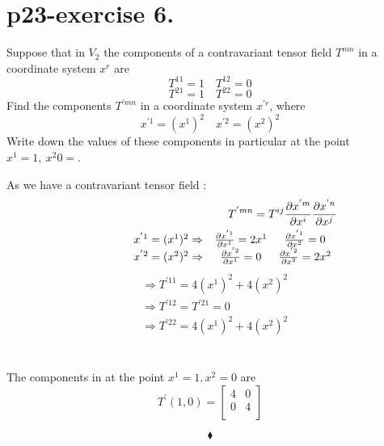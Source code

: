 \section{p23-exercise 6.}
\begin{tcolorbox}
Suppose that in $V_2$ the components of a contravariant tensor field $T^{mn}$ in a coordinate system $x^r$ are 
$$T^{11}=1 \quad T^{12}=0$$
$$T^{21}=1 \quad T^{22}=0$$
Find the components $T^{'mn}$ in a coordinate system $x^{'r}$, where
$$x^{'1} =(x^{1})^2\quad x^{'2} = (x^{2})^2$$
Write down the values of these components in particular at the point $x^1 = 1,\ x^2 0 =$.
\end{tcolorbox}
As we have a contravariant tensor field :
\begin{align*}
\ T^{'mn} =  T^{ij}\pdv{x^{'m}}{x^{i}}\pdv{x^{'n}}{x^{j}}\\
 \begin{array}{ccc}
   \quad \quad \quad \quad  x^{'1} =(x^{1})^2  \Rightarrow & \pdv{x^{'1}}{x^{1}} = 2x^{1} & \pdv{x^{'1}}{x^{2}} = 0\\
\quad \quad \quad \quad x^{'2} =(x^{2})^2  \Rightarrow & \pdv{x^{'2}}{x^{1}} = 0 & \pdv{x^{'2}}{x^{2}} = 2x^{2}\\
  \end{array}\\
  \end{align*}
  \begin{align*}
  &\Rightarrow T^{'11} = 4(x^{1})^2 + 4(x^{2})^2 \\
  &\Rightarrow T^{'12} = T^{'21}=0 \\
  &\Rightarrow T^{'22} = 4(x^{1})^2 + 4(x^{2})^2
  \end{align*}\\\\
  The components in  at the point $x^1 = 1, x^2 = 0$ are
  $$T^{'}(1,0) = \left[{\begin{array}{cc} 4 & 0 \\
    0 & 4 \\ 
    \end{array} } \right]$$
    
    $$\blacklozenge$$
\pagebreak[4]


